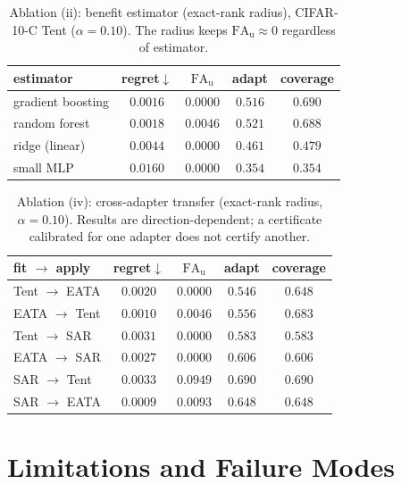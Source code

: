 \begin{table}[t]\centering\footnotesize
\caption{Ablation (ii): benefit estimator (exact-rank radius), CIFAR-10-C Tent ($\alpha{=}0.10$).
The radius keeps $\mathrm{FA}_{\mathrm u}{\approx}0$ regardless of estimator.}
\label{tab:abl-estimator}
\begin{tabular}{lcccc}
\toprule
estimator & regret$\downarrow$ & $\mathrm{FA}_{\mathrm u}$ & adapt & coverage \\
\midrule
gradient boosting & $0.0016$ & $0.0000$ & $0.516$ & $0.690$ \\
random forest & $0.0018$ & $0.0046$ & $0.521$ & $0.688$ \\
ridge (linear) & $0.0044$ & $0.0000$ & $0.461$ & $0.479$ \\
small MLP & $0.0160$ & $0.0000$ & $0.354$ & $0.354$ \\
\bottomrule
\end{tabular}
\end{table}

\begin{table}[t]\centering\footnotesize
\caption{Ablation (iv): cross-adapter transfer (exact-rank radius, $\alpha{=}0.10$). Results are
direction-dependent; a certificate calibrated for one adapter does not certify another.}
\label{tab:abl-transfer}
\begin{tabular}{lcccc}
\toprule
fit $\to$ apply & regret$\downarrow$ & $\mathrm{FA}_{\mathrm u}$ & adapt & coverage \\
\midrule
Tent $\to$ EATA & $0.0020$ & $0.0000$ & $0.546$ & $0.648$ \\
EATA $\to$ Tent & $0.0010$ & $0.0046$ & $0.556$ & $0.683$ \\
Tent $\to$ SAR & $0.0031$ & $0.0000$ & $0.583$ & $0.583$ \\
EATA $\to$ SAR & $0.0027$ & $0.0000$ & $0.606$ & $0.606$ \\
SAR $\to$ Tent & $0.0033$ & $0.0949$ & $0.690$ & $0.690$ \\
SAR $\to$ EATA & $0.0009$ & $0.0093$ & $0.648$ & $0.648$ \\
\bottomrule
\end{tabular}
\end{table}



\section{Limitations and Failure Modes}\label{sec:limits}\label{sec:discussion}


